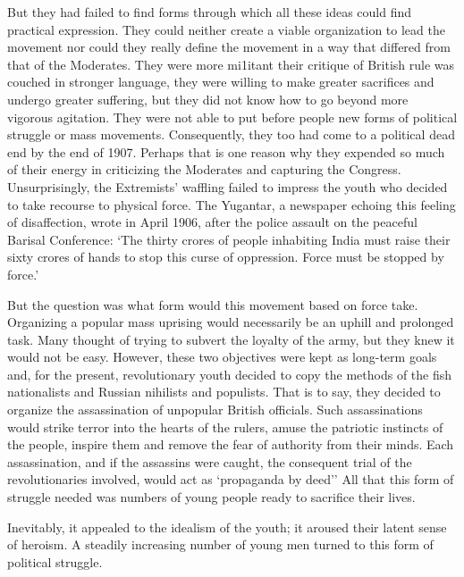 But they had failed to find forms through which all these ideas could find practical expression. They could neither create a viable organization to lead the movement nor could they really define the movement in a way that differed from that of the Moderates. They were more mi1itant their critique of British rule was couched in stronger language, they were willing to make greater sacrifices and undergo greater suffering, but they did not know how to go beyond more vigorous agitation. They were not able to put before people new forms of political struggle or mass movements. Consequently, they too had come to a political dead end by the end of 1907. Perhaps that is one reason why they expended so much of their energy in criticizing the Moderates and capturing the Congress. Unsurprisingly, the Extremists' waffling failed to impress the youth who decided to take recourse to physical force. The Yugantar, a newspaper echoing this feeling of disaffection, wrote in April 1906, after the police assault on the peaceful Barisal Conference: `The thirty crores of people inhabiting India must raise their sixty crores of hands to stop this curse of oppression. Force must be stopped by force.'

But the question was what form would this movement based on force take. Organizing a popular mass uprising would necessarily be an uphill and prolonged task. Many thought of trying to subvert the loyalty of the army, but they knew it would not be easy. However, these two objectives were kept as long-term goals and, for the present, revolutionary youth decided to copy the methods of the fish nationalists and Russian nihilists and populists. That is to say, they decided to organize the assassination of unpopular British officials. Such assassinations would strike terror into the hearts of the rulers, amuse the patriotic instincts of the people, inspire them and remove the fear of authority from their minds. Each assassination, and if the assassins were caught, the consequent trial of the revolutionaries involved, would act as `propaganda by deed'' All that this form of struggle needed was numbers of young people ready to sacrifice their lives.

Inevitably, it appealed to the idealism of the youth; it aroused their latent sense of heroism. A steadily increasing number of young men turned to this form of political struggle.

